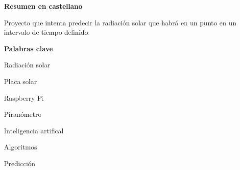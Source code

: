 
\newpage

\thispagestyle{empty}

\begin{center}

{\bf \Huge Resumen en castellano}

  \end{center}
\vspace{1cm}

Proyecto que intenta predecir la radiación solar que habrá en un punto en un intervalo de tiempo definido.

\vspace{1cm}

\begin{center}

{\bf \Large Palabras clave}
\vspace{1cm}

   Radiación solar
   \vspace{0.5cm}

   Placa solar
   \vspace{0.5cm}

   Raspberry Pi
   \vspace{0.5cm}

   Piranómetro
   \vspace{0.5cm}

   Inteligencia artifical
   \vspace{0.5cm}

   Algoritmos
   \vspace{0.5cm}

   Predicción
   \vspace{0.5cm}

   \end{center}

   \vspace{0.5cm}

   




   


